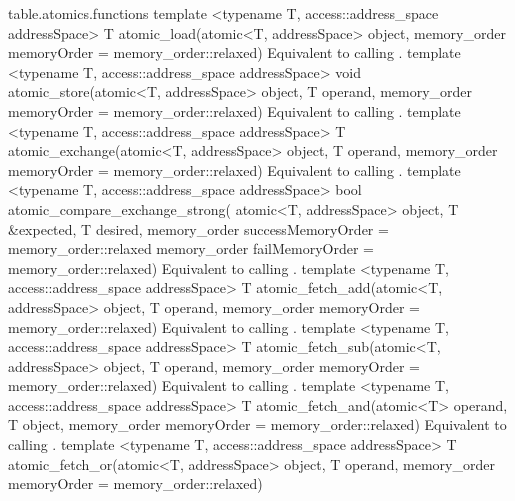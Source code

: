 {table.atomics.functions}
  \addRowThreeSL
    { template <typename T, access::address_space addressSpace> }
    { T atomic_load(atomic<T, addressSpace> object, }
    { memory_order memoryOrder = memory_order::relaxed) }
    {
      Equivalent to calling .
    }
  \addRowThreeSL
    { template <typename T, access::address_space addressSpace> }
    { void atomic_store(atomic<T, addressSpace> object, T operand, }
    { memory_order memoryOrder = memory_order::relaxed) }
    {
      Equivalent to calling .
    }
  \addRowThreeSL
    { template <typename T, access::address_space addressSpace> }
    { T atomic_exchange(atomic<T, addressSpace> object, T operand, }
    { memory_order memoryOrder = memory_order::relaxed) }
    {
      Equivalent to calling .
    }
  \addRowSevenSL
    { template <typename T, access::address_space addressSpace> }
    { bool atomic_compare_exchange_strong( }
    { atomic<T, addressSpace> object, T \&expected, T desired,}
    { memory_order successMemoryOrder = }
    { memory_order::relaxed }
    { memory_order failMemoryOrder = }
    { memory_order::relaxed) }
    {
      Equivalent to calling .
    }
  \addRowThreeSL
    { template <typename T, access::address_space addressSpace> }
    { T atomic_fetch_add(atomic<T, addressSpace> object, T operand, }
    { memory_order memoryOrder = memory_order::relaxed) }
    {
      Equivalent to calling .
    }
  \addRowThreeSL
    { template <typename T, access::address_space addressSpace> }
    { T atomic_fetch_sub(atomic<T, addressSpace> object, T operand, }
    { memory_order memoryOrder = memory_order::relaxed) }
    {
      Equivalent to calling .
    }
  \addRowThreeSL
    { template <typename T, access::address_space addressSpace> }
    { T atomic_fetch_and(atomic<T> operand, T object, }
    { memory_order memoryOrder = memory_order::relaxed) }
    {
      Equivalent to calling .
    }
  \addRowThreeSL
    { template <typename T, access::address_space addressSpace> }
    { T atomic_fetch_or(atomic<T, addressSpace> object, T operand, }
    { memory_order memoryOrder = memory_order::relaxed) }
